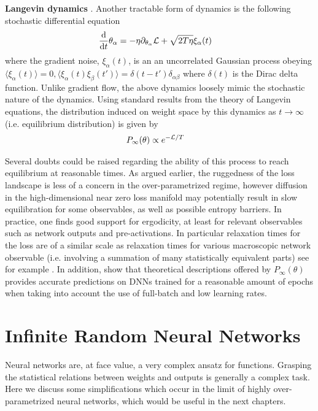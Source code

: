 {\bf Langevin dynamics} \citep{Welling2011,williams1996computing}. Another tractable form of dynamics is the following stochastic differential equation 
\begin{align}
\frac{\text{d}}{\text{d} t} \theta_{\alpha}&= -\eta\partial_{\theta_{\alpha}} \mathcal{L} + \sqrt{2 T \eta} \xi_{\alpha}(t) 
\end{align}
where the gradient noise, $\xi_{\alpha}(t)$, is an an uncorrelated Gaussian process obeying $\langle \xi_{\alpha}(t) \rangle = 0, \langle \xi_{\alpha}(t) \xi_{\beta}(t') \rangle = \delta(t-t') \delta_{\alpha \beta}$ where $\delta(t)$ is the Dirac delta function. Unlike gradient flow, the above dynamics loosely mimic the stochastic nature of the dynamics. Using standard results from the theory of Langevin equations, the distribution induced on weight space by this dynamics as $t \rightarrow \infty$ (i.e. equilibrium distribution) is given by \cite{gardiner2010stochastic}
\begin{align}
\label{Eq:BoltzmannDistWeights}
P_{\infty}(\theta) &\propto e^{-\mathcal{L}/T}
\end{align}

Several doubts could be raised regarding the ability of this process to reach equilibrium at reasonable times. As argued earlier, the ruggedness of the loss landscape is less of a concern in the over-parametrized regime, however diffusion in the high-dimensional near zero loss manifold may potentially result in slow equilibration for some observables, as well as possible entropy barriers. In practice, one finds good support for ergodicity, at least for relevant observables such as network outputs and pre-activations. In particular relaxation times for the loss are of a similar scale as relaxation times for various macroscopic network observable (i.e. involving a summation of many statistically equivalent parts) see for example \cite{naveh2021predicting}. In addition, \cite{LiSompolinsky2021, ariosto2022statistical,naveh2021predicting} show that theoretical descriptions offered by $P_{\infty}(\theta)$ provides accurate predictions on DNNs trained for a reasonable amount of epochs when taking into account the use of full-batch and low learning rates. 

\section{Infinite Random Neural Networks}
\label{Sec:InfiniteRandomDNNs}
Neural networks are, at face value, a very complex ansatz for functions. Grasping the statistical relations between weights and outputs is generally a complex task. Here we discuss some simplifications which occur in the limit of highly over-parametrized neural networks, which would be useful in the next chapters.  

